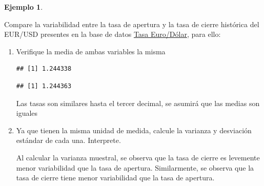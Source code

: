 \documentclass[
  11pt,
]{book}
\newenvironment{Shaded}{\begin{snugshade}}{\end{snugshade}}
\newcommand{\CommentTok}[1]{\textcolor[rgb]{0.56,0.35,0.01}{\textit{#1}}}
\newcommand{\FunctionTok}[1]{\textcolor[rgb]{0.13,0.29,0.53}{\textbf{#1}}}
\newcommand{\NormalTok}[1]{#1}
\newcommand{\SpecialCharTok}[1]{\textcolor[rgb]{0.81,0.36,0.00}{\textbf{#1}}}
\theoremstyle{definition}
\theoremstyle{definition}
\newtheorem{example}{Ejemplo}[chapter]
\theoremstyle{definition}
\theoremstyle{definition}
\theoremstyle{remark}
\begin{document}
\begin{example}
\protect\hypertarget{exm:EUR-USD-varianza}{}\label{exm:EUR-USD-varianza}

Compare la variabilidad entre la tasa de apertura y la tasa de cierre histórica del EUR/USD presentes en la base de datos \hyperref[TasaEURUSD]{Tasa Euro/Dólar}, para ello:

\begin{enumerate}
\def\labelenumi{\arabic{enumi}.}
\item
  Verifique la media de ambas variables la misma

\begin{Shaded}
\end{Shaded}

\begin{verbatim}
## [1] 1.244338
\end{verbatim}

\begin{Shaded}
\end{Shaded}

\begin{verbatim}
## [1] 1.244363
\end{verbatim}

  Las tasas son similares hasta el tercer decimal, se asumirá que las medias son iguales
\item
  Ya que tienen la misma unidad de medida, calcule la varianza y desviación estándar de cada una. Interprete.

  Al calcular la varianza muestral, se observa que la tasa de cierre es levemente menor variabilidad que la tasa de apertura. Similarmente, se observa que la tasa de cierre tiene menor variabilidad que la tasa de apertura.

\begin{Shaded}
\end{Shaded}


\end{enumerate}
\end{example}
\end{document}
